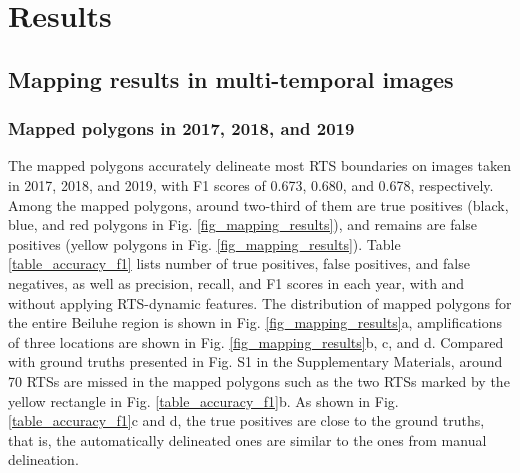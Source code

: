 \documentclass[authoryear,preprint,review,12pt]{elsarticle}
\begin{document}

\section{Results}
\label{sec_result}

\subsection{Mapping results in multi-temporal images}
\label{sec_mapping_performance}

\subsubsection{Mapped polygons in 2017, 2018, and 2019}
\label{sec_mapped_polygons}

The mapped polygons accurately delineate most RTS boundaries on images taken in 2017, 2018, and 2019, with F1 scores of 0.673, 0.680, and 0.678, respectively.
Among the mapped polygons, around two-third of them are true positives (black, blue, and red polygons in Fig. \ref{fig_mapping_results}), and remains are false positives (yellow polygons in Fig. \ref{fig_mapping_results}). 
Table \ref{table_accuracy_f1} lists number of true positives, false positives, and false negatives, as well as precision, recall, and F1 scores in each year, with and without applying RTS-dynamic features.
The distribution of mapped polygons for the entire Beiluhe region is shown in Fig. \ref{fig_mapping_results}a, amplifications of three locations are shown in Fig. \ref{fig_mapping_results}b, c, and d. 
Compared with ground truths presented in Fig. S1 in the Supplementary Materials,  around 70 RTSs are missed in the mapped polygons such as the two RTSs marked by the yellow rectangle in Fig. \ref{table_accuracy_f1}b.
As shown in Fig. \ref{table_accuracy_f1}c and d, the true positives are close to the ground truths, that is, the automatically delineated ones are similar to the ones from manual delineation. 

\end{document}
